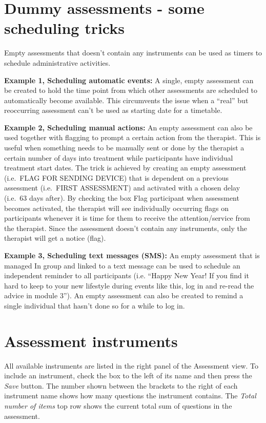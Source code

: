 \documentclass[]{book}
\begin{document}
\hypertarget{dummy-assessments---some-scheduling-tricks}{%
\section{Dummy assessments - some scheduling tricks}\label{dummy-assessments---some-scheduling-tricks}}

Empty assessments that doesn't contain any instruments can be used as timers to schedule administrative activities.

\textbf{Example 1, Scheduling automatic events:} A single, empty assessment can be created to hold the time point from which other assessments are scheduled to automatically become available. This circumvents the issue when a ``real'' but reoccurring assessment can't be used as starting date for a timetable.

\textbf{Example 2, Scheduling manual actions:} An empty assessment can also be used together with flagging to prompt a certain action from the therapist. This is useful when something needs to be manually sent or done by the therapist a certain number of days into treatment while participants have individual treatment start dates. The trick is achieved by creating an empty assessment (i.e.~FLAG FOR SENDING DEVICE) that is dependent on a previous assessment (i.e.~FIRST ASSESSMENT) and activated with a chosen delay (i.e.~63 days after). By checking the box Flag participant when assessment becomes activated, the therapist will see individually occurring flags on participants whenever it is time for them to receive the attention/service from the therapist. Since the assessment doesn't contain any instruments, only the therapist will get a notice (flag).

\textbf{Example 3, Scheduling text messages (SMS):} An empty assessment that is managed In group and linked to a text message can be used to schedule an independent reminder to all participants (i.e. ``Happy New Year! If you find it hard to keep to your new lifestyle during events like this, log in and re-read the advice in module 3''). An empty assessment can also be created to remind a single individual that hasn't done so for a while to log in.

\hypertarget{assessment-instruments}{%
\section{Assessment instruments}\label{assessment-instruments}}

All available instruments are listed in the right panel of the Assessment view. To include an instrument, check the box to the left of its name and then press the \emph{Save} button. The number shown between the brackets to the right of each instrument name shows how many questions the instrument contains. The \emph{Total number of items} top row shows the current total sum of questions in the assessment.
\end{document}
